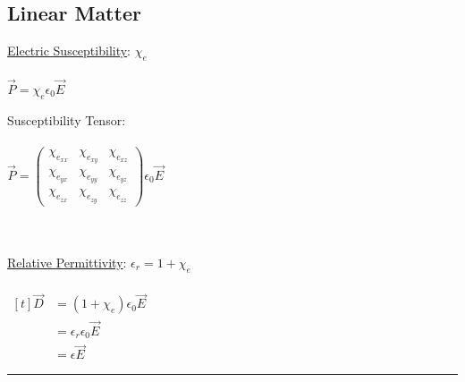 \documentclass[12pt]{article}
\begin{document}
\subsection{Linear Matter}
\hfill \break
\begin{minipage}[t]{0.48\textwidth}
	\setlength{\parindent}{.5cm}
	
	\noindent \underline{Electric Susceptibility}: \( \chi_e \) \\ \\
	\indent \indent \( \vec{ P } = \chi_e \epsilon_0 \vec{E} \)

	\hfill \break
	Susceptibility Tensor: \\ \\
	\indent \indent \( \vec{ P } = 
		\begin{pmatrix}
			\chi_{e_{xx}} & \chi_{e_{xy}} & \chi_{e_{xz}} \\
			\chi_{e_{yx}} & \chi_{e_{yy}} & \chi_{e_{yz}} \\
			\chi_{e_{zx}} & \chi_{e_{zy}} & \chi_{e_{zz}}
		\end{pmatrix}
		\epsilon_0 \vec{E} \)

	\hfill \break \\ \\
	\underline{Relative Permittivity}: \( \epsilon_r = 1 + \chi_e \)\\ \\
	\indent \indent \( \begin{aligned}[t]
			\vec{D} &= ( 1 + \chi_e ) \epsilon_0 \vec{E} \\ 
			&= \epsilon_r \epsilon_0 \vec{E}\\
			&= \epsilon \vec{E}
	\end{aligned} \)

\end{minipage}
\hspace{0.02\textwidth}
\rule[-430pt]{.5pt}{440pt}
\hspace{0.02\textwidth}
\end{document}
